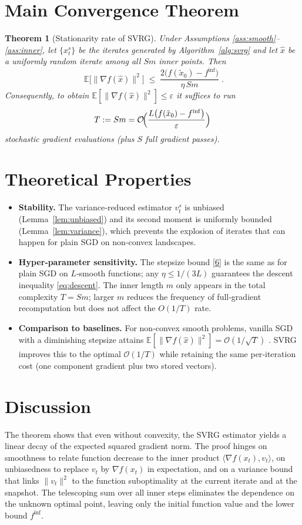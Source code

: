 \documentclass[11pt]{article}
\newtheorem{theorem}{Theorem}
\newcommand{\E}{\mathbb{E}}
\begin{document}
\section*{Main Convergence Theorem}
\begin{theorem}[Stationarity rate of SVRG]\label{thm:svrg}
Under Assumptions \ref{ass:smooth}–\ref{ass:inner}, let $\{x^{s}_t\}$ be the iterates generated by Algorithm~\ref{alg:svrg} and let $\hat{x}$ be a uniformly random iterate among all $S m$ inner points.  Then
\[
\boxed{\;
\E\!\bigl[\|\nabla f(\hat{x})\|^{2}\bigr]\;\le\;
\frac{2\bigl(f(\tilde{x}_0)-f^{\inf}\bigr)}{\eta\,S m}\; }.
\tag{7}
\]
Consequently, to obtain $\E[\|\nabla f(\hat{x})\|^{2}]\le\varepsilon$ it suffices to run
\[
T:=S m = \mathcal{O}\!\Bigl(\frac{L\bigl(f(\tilde{x}_0)-f^{\inf}\bigr)}{\varepsilon}\Bigr)
\]
stochastic gradient evaluations (plus $S$ full gradient passes).
\end{theorem}

\section*{Theoretical Properties}
\begin{itemize}
\item \textbf{Stability.} The variance‑reduced estimator $v^{s}_t$ is unbiased (Lemma~\ref{lem:unbiased}) and its second moment is uniformly bounded (Lemma~\ref{lem:variance}), which prevents the explosion of iterates that can happen for plain SGD on non‑convex landscapes.
\item \textbf{Hyper‑parameter sensitivity.} The stepsize bound \eqref{6} is the same as for plain SGD on $L$‑smooth functions; any $\eta\le1/(3L)$ guarantees the descent inequality \eqref{eq:descent}.  The inner length $m$ only appears in the total complexity $T=S m$; larger $m$ reduces the frequency of full‑gradient recomputation but does not affect the $O(1/T)$ rate.
\item \textbf{Comparison to baselines.} For non‑convex smooth problems, vanilla SGD with a diminishing stepsize attains $\E[\|\nabla f(\hat{x})\|^{2}]=\mathcal{O}(1/\sqrt{T})$ \cite{ghadimi2013stochastic}.  SVRG improves this to the optimal $\mathcal{O}(1/T)$ while retaining the same per‑iteration cost (one component gradient plus two stored vectors).
\end{itemize}

\section*{Discussion}
The theorem shows that even without convexity, the SVRG estimator yields a linear decay of the expected squared gradient norm.  The proof hinges on smoothness to relate function decrease to the inner product $\langle\nabla f(x_t),v_t\rangle$, on unbiasedness to replace $v_t$ by $\nabla f(x_t)$ in expectation, and on a variance bound that links $\|v_t\|^2$ to the function suboptimality at the current iterate and at the snapshot.  The telescoping sum over all inner steps eliminates the dependence on the unknown optimal point, leaving only the initial function value and the lower bound $f^{\inf}$.
\end{document}
